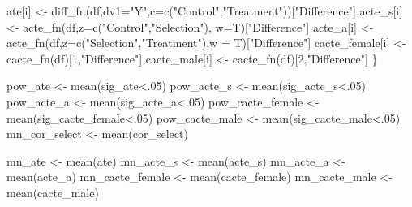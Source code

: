 \documentclass[
]{article}
\newenvironment{Shaded}{\begin{snugshade}}{\end{snugshade}}
\newcommand{\AttributeTok}[1]{\textcolor[rgb]{0.77,0.63,0.00}{#1}}
\newcommand{\DecValTok}[1]{\textcolor[rgb]{0.00,0.00,0.81}{#1}}
\newcommand{\FunctionTok}[1]{\textcolor[rgb]{0.00,0.00,0.00}{#1}}
\newcommand{\NormalTok}[1]{#1}
\newcommand{\OtherTok}[1]{\textcolor[rgb]{0.56,0.35,0.01}{#1}}
\newcommand{\SpecialCharTok}[1]{\textcolor[rgb]{0.00,0.00,0.00}{#1}}
\newcommand{\StringTok}[1]{\textcolor[rgb]{0.31,0.60,0.02}{#1}}
\begin{document}
\begin{Shaded}
\begin{Highlighting}[]
\NormalTok{    ate[i] }\OtherTok{\textless{}{-}} \FunctionTok{diff\_fn}\NormalTok{(df,}\AttributeTok{dv1=}\StringTok{"Y"}\NormalTok{,}\AttributeTok{c=}\FunctionTok{c}\NormalTok{(}\StringTok{"Control"}\NormalTok{,}\StringTok{"Treatment"}\NormalTok{))[}\StringTok{"Difference"}\NormalTok{]}
\NormalTok{    acte\_s[i] }\OtherTok{\textless{}{-}} \FunctionTok{acte\_fn}\NormalTok{(df,}\AttributeTok{z=}\FunctionTok{c}\NormalTok{(}\StringTok{"Control"}\NormalTok{,}\StringTok{"Selection"}\NormalTok{), }\AttributeTok{w=}\NormalTok{T)[}\StringTok{"Difference"}\NormalTok{]}
\NormalTok{    acte\_a[i] }\OtherTok{\textless{}{-}} \FunctionTok{acte\_fn}\NormalTok{(df,}\AttributeTok{z=}\FunctionTok{c}\NormalTok{(}\StringTok{"Selection"}\NormalTok{,}\StringTok{"Treatment"}\NormalTok{),}\AttributeTok{w =}\NormalTok{ T)[}\StringTok{"Difference"}\NormalTok{]}
\NormalTok{    cacte\_female[i] }\OtherTok{\textless{}{-}} \FunctionTok{cacte\_fn}\NormalTok{(df)[}\DecValTok{1}\NormalTok{,}\StringTok{"Difference"}\NormalTok{]}
\NormalTok{    cacte\_male[i] }\OtherTok{\textless{}{-}} \FunctionTok{cacte\_fn}\NormalTok{(df)[}\DecValTok{2}\NormalTok{,}\StringTok{"Difference"}\NormalTok{]}
\NormalTok{  \}}
  
\NormalTok{  pow\_ate }\OtherTok{\textless{}{-}} \FunctionTok{mean}\NormalTok{(sig\_ate}\SpecialCharTok{\textless{}}\NormalTok{.}\DecValTok{05}\NormalTok{)}
\NormalTok{  pow\_acte\_s }\OtherTok{\textless{}{-}} \FunctionTok{mean}\NormalTok{(sig\_acte\_s}\SpecialCharTok{\textless{}}\NormalTok{.}\DecValTok{05}\NormalTok{)}
\NormalTok{  pow\_acte\_a }\OtherTok{\textless{}{-}} \FunctionTok{mean}\NormalTok{(sig\_acte\_a}\SpecialCharTok{\textless{}}\NormalTok{.}\DecValTok{05}\NormalTok{)}
\NormalTok{  pow\_cacte\_female }\OtherTok{\textless{}{-}}  \FunctionTok{mean}\NormalTok{(sig\_cacte\_female}\SpecialCharTok{\textless{}}\NormalTok{.}\DecValTok{05}\NormalTok{)}
\NormalTok{  pow\_cacte\_male }\OtherTok{\textless{}{-}} \FunctionTok{mean}\NormalTok{(sig\_cacte\_male}\SpecialCharTok{\textless{}}\NormalTok{.}\DecValTok{05}\NormalTok{)}
\NormalTok{  mn\_cor\_select }\OtherTok{\textless{}{-}} \FunctionTok{mean}\NormalTok{(cor\_select)}
  
\NormalTok{  mn\_ate }\OtherTok{\textless{}{-}} \FunctionTok{mean}\NormalTok{(ate)}
\NormalTok{  mn\_acte\_s }\OtherTok{\textless{}{-}} \FunctionTok{mean}\NormalTok{(acte\_s)}
\NormalTok{  mn\_acte\_a }\OtherTok{\textless{}{-}} \FunctionTok{mean}\NormalTok{(acte\_a)}
\NormalTok{  mn\_cacte\_female }\OtherTok{\textless{}{-}}  \FunctionTok{mean}\NormalTok{(cacte\_female)}
\NormalTok{  mn\_cacte\_male }\OtherTok{\textless{}{-}} \FunctionTok{mean}\NormalTok{(cacte\_male)}
  

\end{Highlighting}
\end{Shaded}
\end{document}

